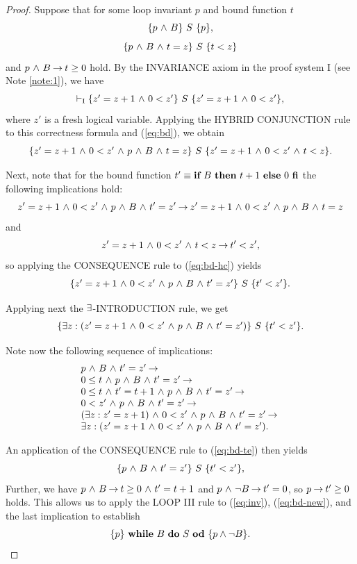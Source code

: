\documentclass[manuscript, screen, review]{acmart}
\begin{document}
\begin{proof}
Suppose that for some loop invariant $p$ and bound function $t$
\begin{equation} \label{eq:inv}
\HT{p \A B}{S}{p},
\end{equation}
\begin{equation} \label{eq:bd}
\HT{p \A B \A t=z}{S}{t<z}
\end{equation}
and
$p \A B \ra t \geq 0$ hold.
By the INVARIANCE axiom in the proof system I (see Note \ref{note:1}),
we have
\[
\vdash_{\rm{I}}  \HT{z' = z+1 \A 0 < z'}{S}{z' = z+1 \A 0 < z'},
\]
where $z'$ is a fresh logical variable.
Applying the HYBRID CONJUNCTION rule to this correctness formula and (\ref{eq:bd}),
we obtain
\begin{equation}\label{eq:bd-hc}
 \HT{z' = z+1 \A 0 < z' \A p \A B \A t=z}{S}{z' = z+1 \A 0 < z' \A t<z}.
\end{equation}

Next, note that for the bound function $t' \equiv \ITE{B}{t+1}{0}$
the following implications hold:
\[
  z' = z+1 \A 0 < z' \A p \A B \A t'=z' \ra
    z' = z+1 \A 0 < z' \A p \A B \A t=z
\]
and
\[
  z' = z+1 \A 0 < z' \A t<z \ra t' < z',
\]
so applying the CONSEQUENCE rule to (\ref{eq:bd-hc}) yields
\[
  \HT{z' = z+1 \A 0 < z' \A p \A B \A t'=z'}{S}{t'<z'}.
\]

Applying next the $\te$-INTRODUCTION rule,  we get
\begin{equation}\label{eq:bd-te}
  \HT{\te z: (z' = z+1 \A 0 < z' \A p \A B \A t'=z')}{S}{t'<z'}.
\end{equation}

Note now the following sequence of implications:
\[
  \begin{array}{l}
    p \A B \A t'=z' \ra \\
    0 \leq t \A p \A B \A t'=z' \ra \\
    0 \leq t \A t' = t+1 \A p \A B \A t'=z' \ra \\
    0 < z' \A p \A B \A t'=z' \ra \\
    (\te z: z' = z+1) \A 0 < z' \A p \A B \A t'=z'  \ra \\
    \te z: (z' = z+1 \A 0 < z' \A p \A B \A t'=z'). 
  \end{array}
\]

An application of the CONSEQUENCE rule to (\ref{eq:bd-te}) then yields
\begin{equation}\label{eq:bd-new}
  \HT{p \A B \A t'=z'}{S}{t'<z'},
\end{equation}
Further, we have $p \A B \ra t \geq 0 \A t' = t+1$ and 
$p \A \neg B \ra t' = 0$, so 
$p \ra t' \geq 0$ holds.
This allows us to apply the LOOP III rule to (\ref{eq:inv}), (\ref{eq:bd-new}),
and the last implication to establish
\[
 \HT{p}{\WDD{B}{S}}{p \wedge \neg B}.
\]
\end{proof}
\end{document}
